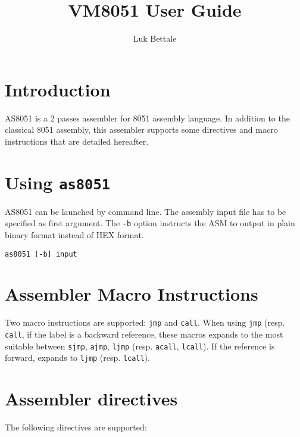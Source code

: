 \documentclass{article}
\title{VM8051 User Guide}
\author{Luk Bettale}
\date{}
\begin{document}
\maketitle

\section*{Introduction}
AS8051 is a 2 passes assembler for 8051 assembly language. In addition
to the classical 8051 assembly, this assembler supports some
directives and macro instructions that are detailed hereafter.

\section*{Using \texttt{as8051}}
AS8051 can be launched by command line. The assembly input file has to
be specified as first argument. The \texttt{-b} option instructs the
ASM to output in plain binary format instead of HEX format.

\begin{verbatim}
as8051 [-b] input
\end{verbatim}

\section*{Assembler Macro Instructions}
Two macro instructions are supported: \texttt{jmp} and
\texttt{call}. When using \texttt{jmp} (resp. \texttt{call}, if the
label is a backward reference, these macros expands to the most
suitable between \texttt{sjmp}, \texttt{ajmp}, \texttt{ljmp}
(resp. \texttt{acall}, \texttt{lcall}). If the reference is forward,
expands to \texttt{ljmp} (resp. \texttt{lcall}).

\section*{Assembler directives}
The following directives are supported:
\end{document}
